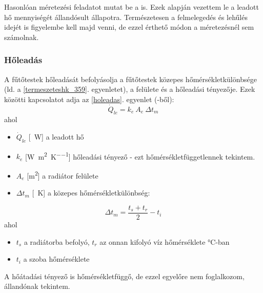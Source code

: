 Hasonlóan méretezési feladatot mutat be a \cite[4.2.7.3]{Herz} is. Ezek alapján vezettem le a leadott hő mennyiségét állandósult állapotra. Természetesen a felmelegedés és lehűlés idejét is figyelembe kell majd venni, de ezzel érthető módon a méretezésnél sem számolnak.%


\subsubsection{Hőleadás}
A fűtőtestek hőleadását befolyásolja a fűtőtestek közepes hőmérsékletkülönbsége (ld. a \ref{termeszeteshk_359}. egyenletet), a felülete és a hőleadási tényezője.
%
Ezek közötti kapcsolatot adja az \ref{holeadas}. egyenlet (\cite[358.~o.]{Herz}-ből): 
\begin{equation} \label{holeadas}
\dot Q_{le} = k_e ~ A_e ~ \Delta t_m
\end{equation}
%
%
ahol
\begin{itemize}[itemsep=6pt,topsep=0pt,parsep=0pt,partopsep=0pt]
\item[] $\dot{Q}_{le}$ [\SI{}{\watt}] a leadott hő
\item[] $k_e$ [\si[per-mode = fraction]{\watt\per\meter\squared\per\kelvin}] hőleadási tényező - ezt hőmérsékletfüggetlennek tekintem.
\item[] $A_e$ [\si{\metre\squared}] a radiátor felülete
\item[] $\Delta t_m$ [\SI{}{\kelvin}] a közepes hőmérsékletkülönbség:
\end{itemize}
%
\begin{equation} \label{termeszeteshk_359}
\Delta t_m = \frac{t_s+t_r}{2} -t_{i}
\end{equation}
ahol
%
\begin{itemize}[itemsep=6pt,topsep=0pt,parsep=0pt,partopsep=0pt]
	\item[] $t_s$ a radiátorba befolyó, $t_r$ az onnan kifolyó víz hőmérséklete \si{\degreeCelsius}-ban
	\item[] $t_i$ a szoba hőmérséklete
\end{itemize}
%
A hőátadási tényező is hőmérsékletfüggő, de ezzel egyelőre nem foglalkozom, állandónak tekintem.
%
%
%
%

